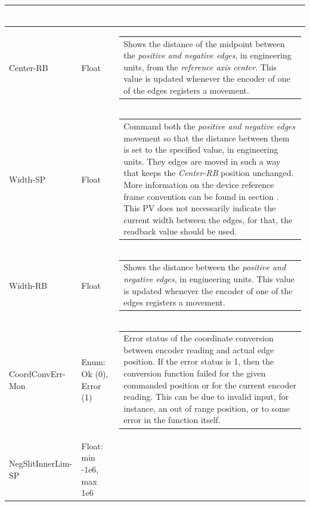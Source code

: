 \documentclass[openany]{article}
\begin{document}
\begin{longtable}{| m{4.5cm} m{2.5cm}  m{7.0cm} |}
\begin{tabular}{@{}m{6cm}@{}}
            \end{tabular} \hypertarget{}{}\\ \hline
        Center-RB & Float & \begin{tabular}{@{}m{6cm}@{}}
                Shows the distance of the midpoint between the \emph{positive and negative edges}, in engineering units, from the \emph{reference axis center}. This value is updated whenever the encoder of one of the edges registers a movement.
            \end{tabular} \hypertarget{pv:width}{}\\ \hline
        Width-SP & Float & \begin{tabular}{@{}m{6cm}@{}}
                Command both the \emph{positive and negative edges} movement so that the distance between them is set to the specified value, in engineering units. They edges are moved in such a way that keeps the \emph{Center-RB} position unchanged. More information on the device reference frame convention can be found in section \nameref{sec:dev-reference-frame}. This PV does not necessarily indicate the current width between the edges, for that, the readback value should be used.
            \end{tabular} \hypertarget{}{}\\ \hline
        Width-RB & Float & \begin{tabular}{@{}m{6cm}@{}}
                Shows the distance between the \emph{positive and negative edges}, in engineering units. This value is updated whenever the encoder of one of the edges registers a movement.
            \end{tabular} \hypertarget{pv:coord-conv-err-mon}{}\\ \hline
        CoordConvErr-Mon & Enum: Ok (0), Error (1) & \begin{tabular}{@{}m{6cm}@{}}
                Error status of the coordinate conversion between encoder reading and actual edge position. If the error status is 1, then the conversion function failed for the given commanded position or for the current encoder reading. This can be due to invalid input, for instance, an out of range position, or to some error in the function itself.
            \end{tabular} \hypertarget{pv:neg-edge-inner-lim}{}\\ \hline
        NegSlitInnerLim-SP & Float: min -1e6, max 1e6 & \begin{tabular}{@{}m{6cm}@{}}

\end{tabular}
\end{longtable}
\end{document}

